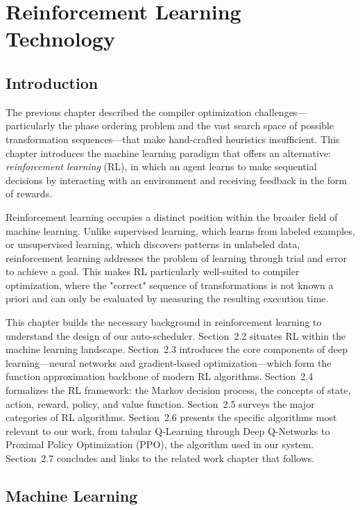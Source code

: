 \chapter{Reinforcement Learning Technology}
\label{ch:rl-foundations}

\section{Introduction}

The previous chapter described the compiler optimization challenges—particularly the phase ordering problem and the vast search space of possible transformation sequences—that make hand-crafted heuristics insufficient. This chapter introduces the machine learning paradigm that offers an alternative: \textit{reinforcement learning} (RL), in which an agent learns to make sequential decisions by interacting with an environment and receiving feedback in the form of rewards.

Reinforcement learning occupies a distinct position within the broader field of machine learning. Unlike supervised learning, which learns from labeled examples, or unsupervised learning, which discovers patterns in unlabeled data, reinforcement learning addresses the problem of learning through trial and error to achieve a goal. This makes RL particularly well-suited to compiler optimization, where the "correct" sequence of transformations is not known a priori and can only be evaluated by measuring the resulting execution time.

This chapter builds the necessary background in reinforcement learning to understand the design of our auto-scheduler. Section~2.2 situates RL within the machine learning landscape. Section~2.3 introduces the core components of deep learning—neural networks and gradient-based optimization—which form the function approximation backbone of modern RL algorithms. Section~2.4 formalizes the RL framework: the Markov decision process, the concepts of state, action, reward, policy, and value function. Section~2.5 surveys the major categories of RL algorithms. Section~2.6 presents the specific algorithms most relevant to our work, from tabular Q-Learning through Deep Q-Networks to Proximal Policy Optimization (PPO), the algorithm used in our system. Section~2.7 concludes and links to the related work chapter that follows.

\section{Machine Learning}

